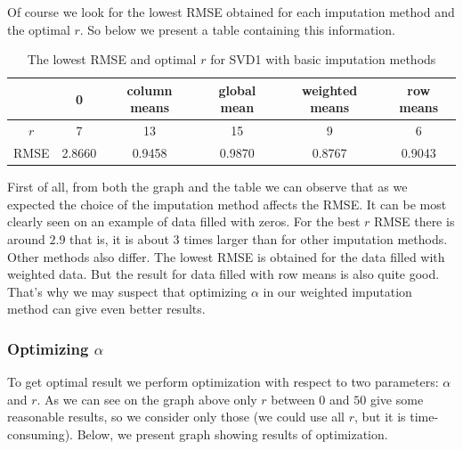\documentclass[11pt]{amsart}
\begin{document}
Of course we look for the lowest RMSE obtained for each imputation method and the optimal $r$.
So below we present a table containing this information.
\begin{table}[H]
\begin{tabular}{c|ccccc}
& 0 & column means & global mean & weighted means & row means \\
\hline
$r$ & 7 & 13 & 15 & 9 & 6 \\
RMSE & 2.8660 & 0.9458 & 0.9870 & 0.8767 & 0.9043 \\
\end{tabular}
\caption{The lowest RMSE and optimal $r$ for SVD1 with basic imputation methods}
\end{table}

First of all, from both the graph and the table we can observe that as we expected the choice of the imputation method affects the RMSE.
It can be most clearly seen on an example of data filled with zeros.
For the best $r$ RMSE there is around $2.9$ that is, it is about 3 times larger than for other imputation methods.
Other methods also differ.
The lowest RMSE is obtained for the data filled with weighted data.
But the result for data filled with row means is also quite good.
That's why we may suspect that optimizing $\alpha$ in our weighted imputation method can give even better results.


\subsubsection*{Optimizing $\alpha$}

To get optimal result we perform optimization with respect to two parameters: $\alpha$ and $r$.
As we can see on the graph above only $r$ between $0$ and $50$ give some reasonable results, so we consider only those (we could use all $r$, but it is time-consuming).
Below, we present graph showing results of optimization.
\end{document}
